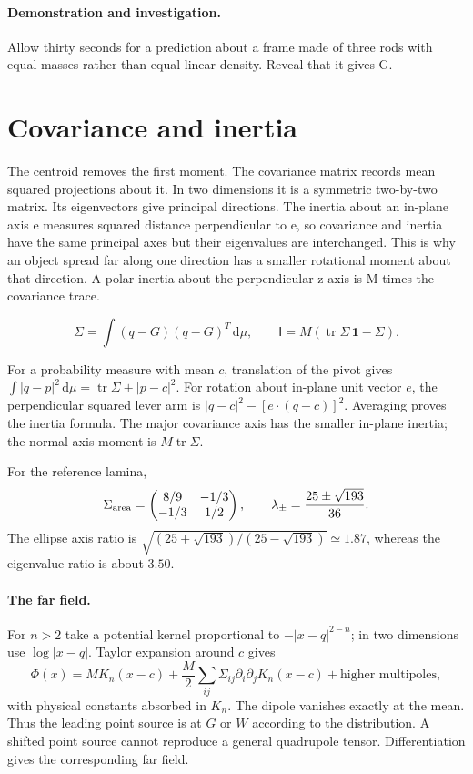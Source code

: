 \documentclass[11pt,oneside,openany]{book}
\newcommand{\tr}{\operatorname{tr}}\newcommand{\dd}{\,\mathrm d}\newcommand{\R}{\mathbb R}
\begin{document}
\paragraph{Demonstration and investigation.} Allow thirty seconds for a prediction about a frame made of three rods with equal masses rather than equal linear density. Reveal that it gives G.


\section{Covariance and inertia}\label{sec:slide10}

The centroid removes the first moment. The covariance matrix records mean squared projections about it. In two dimensions it is a symmetric two-by-two matrix. Its eigenvectors give principal directions. The inertia about an in-plane axis e measures squared distance perpendicular to e, so covariance and inertia have the same principal axes but their eigenvalues are interchanged. This is why an object spread far along one direction has a smaller rotational moment about that direction. A polar inertia about the perpendicular z-axis is M times the covariance trace.


\[\Sigma=\int(q-G)(q-G)^T\dd\mu,\qquad\mathsf I=M(\tr\Sigma\,\mathbf1-\Sigma).\]



For a probability measure with mean $c$, translation of the pivot gives
$\int|q-p|^2\dd\mu=\tr\Sigma+|p-c|^2$.
For rotation about in-plane unit vector $e$, the perpendicular squared
lever arm is $|q-c|^2-[e\cdot(q-c)]^2$. Averaging proves the inertia
formula. The major covariance axis has the smaller in-plane inertia;
the normal-axis moment is $M\tr\Sigma$.

For the reference lamina,
\[
\Sigma_{\rm area}=\begin{pmatrix}8/9&-1/3\\-1/3&1/2\end{pmatrix},
\qquad \lambda_\pm=\frac{25\pm\sqrt{193}}{36}.
\]
The ellipse axis ratio is
$\sqrt{(25+\sqrt{193})/(25-\sqrt{193})}\simeq1.87$,
whereas the eigenvalue ratio is about $3.50$.

\paragraph{The far field.}
For $n>2$ take a potential kernel proportional to $-|x-q|^{2-n}$;
in two dimensions use $\log|x-q|$. Taylor expansion around $c$ gives
\[
\Phi(x)=M K_n(x-c)+
\frac M2\sum_{ij}\Sigma_{ij}\partial_i\partial_jK_n(x-c)
+\text{higher multipoles},
\]
with physical constants absorbed in $K_n$. The dipole vanishes exactly
at the mean. Thus the leading point source is at $G$ or $W$ according
to the distribution. A shifted point source cannot reproduce a general
quadrupole tensor. Differentiation gives the corresponding far field.
\end{document}
